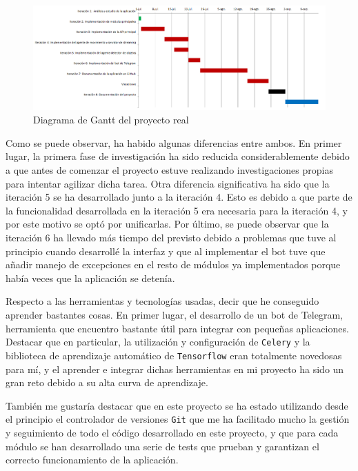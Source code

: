 \newpage

\begin{figure}[h]
	\centering
	\includegraphics[scale=0.45]{images/diagrama_gantt_real}
	\caption{Diagrama de Gantt del proyecto real}
\end{figure}

Como se puede observar, ha habido algunas diferencias entre ambos. En primer lugar, la primera fase de investigación ha sido reducida considerablemente debido a que antes de comenzar el proyecto estuve realizando investigaciones propias para intentar agilizar dicha tarea. Otra diferencia significativa ha sido que la iteración 5 se ha desarrollado junto a la iteración 4. Esto es debido a que parte de la funcionalidad desarrollada en la iteración 5 era necesaria para la iteración 4, y por este motivo se optó por unificarlas. Por último, se puede observar que la iteración 6 ha llevado más tiempo del previsto debido a problemas que tuve al principio cuando desarrollé la interfaz y que al implementar el bot tuve que añadir manejo de excepciones en el resto de módulos ya implementados porque había veces que la aplicación se detenía.

Respecto a las herramientas y tecnologías usadas, decir que he conseguido aprender bastantes cosas. En primer lugar, el desarrollo de un bot de Telegram, herramienta que encuentro bastante útil para integrar con pequeñas aplicaciones. Destacar que en particular, la utilización y configuración de \texttt{Celery} y la biblioteca de aprendizaje automático de \texttt{Tensorflow} eran totalmente novedosas para mí, y el aprender e integrar dichas herramientas en mi proyecto ha sido un gran reto debido a su alta curva de aprendizaje.

También me gustaría destacar que en este proyecto se ha estado utilizando desde el principio el controlador de versiones \texttt{Git} que me ha facilitado mucho la gestión y seguimiento de todo el código desarrollado en este proyecto, y que para cada módulo se han desarrollado una serie de tests que prueban y garantizan el correcto funcionamiento de la aplicación.

